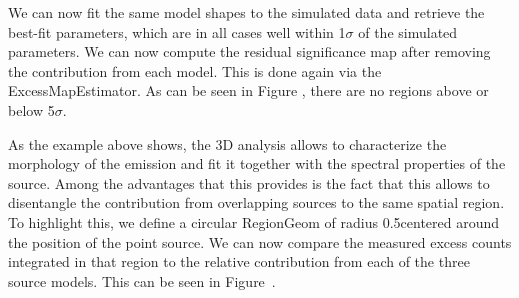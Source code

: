 We can now fit the same model shapes to the simulated data and retrieve the best-fit parameters, which are in all cases well within 1$\sigma$ of the simulated parameters. We can now compute the residual significance map after removing the contribution from each model. This is done again via the ExcessMapEstimator. As can be seen in Figure , there are no regions above or below 5$\sigma$.

As the example above shows, the 3D analysis allows to characterize the morphology of the emission and fit it together with the spectral properties of the source.  Among the advantages that this provides is the fact that this allows to disentangle the contribution from overlapping sources to the same spatial region. To highlight this, we define a circular RegionGeom of radius 0.5\textdegree centered around the position of the point source. We can now compare the measured excess counts integrated in that region to the relative contribution from each of the three source models. This can be seen in Figure~.


%
